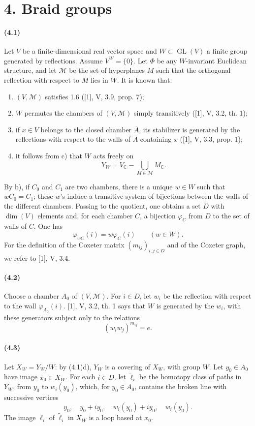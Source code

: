 \documentclass[10pt]{article}
\newcommand{\C}{\mathbb C}
\newcommand{\GL}{\operatorname{GL}}
\begin{document}
\section*{4. Braid groups}

\paragraph{(4.1)} Let \(V\) be a finite-dimensional real vector space and \(W\subset\GL(V)\) a finite group generated by reflections. Assume \(V^W=\{0\}\). Let \(\Phi\) be any \(W\)-invariant Euclidean structure, and let \(\mathcal M\) be the set of hyperplanes \(M\) such that the orthogonal reflection with respect to \(M\) lies in \(W\). It is known that:
\begin{enumerate}[label=\alph*)]
\item \((V,\mathcal M)\) satisfies 1.6 ([1], V, 3.9, prop. 7);
\item \(W\) permutes the chambers of \((V,\mathcal M)\) simply transitively ([1], V, 3.2, th. 1);
\item if \(x\in V\) belongs to the closed chamber \(\overline A\), its stabilizer is generated by the reflections with respect to the walls of \(A\) containing \(x\) ([1], V, 3.3, prop. 1);
\item it follows from c) that \(W\) acts freely on
\[
Y_W=V_\C-\bigcup_{M\in\mathcal M}M_\C.
\]
\end{enumerate}
By b), if \(C_0\) and \(C_1\) are two chambers, there is a unique \(w\in W\) such that \(wC_0=C_1\); these \(w\)'s induce a transitive system of bijections between the walls of the different chambers. Passing to the quotient, one obtains a set \(D\) with \(\dim(V)\) elements and, for each chamber \(C\), a bijection \(\varphi_C\) from \(D\) to the set of walls of \(C\). One has
\[
\tag{4.1.1}
\varphi_{wC}(i)=w\varphi_C(i)\qquad(w\in W).
\]
For the definition of the Coxeter matrix \((m_{ij})_{i,j\in D}\) and of the Coxeter graph, we refer to [1], V, 3.4.

\paragraph{(4.2)} Choose a chamber \(A_0\) of \((V,\mathcal M)\). For \(i\in D\), let \(w_i\) be the reflection with respect to the wall \(\varphi_{A_0}(i)\). [1], V, 3.2, th. 1 says that \(W\) is generated by the \(w_i\), with these generators subject only to the relations
\[
(w_iw_j)^{m_{ij}}=e.
\]

\paragraph{(4.3)} Let \(X_W=Y_W/W\): by (4.1)d), \(Y_W\) is a covering of \(X_W\), with group \(W\). Let \(y_0\in A_0\) have image \(x_0\in X_W\). For each \(i\in D\), let \(\widetilde \ell_i\) be the homotopy class of paths in \(Y_W\), from \(y_0\) to \(w_i(y_0)\), which, for \(y_0\in A_0\), contains the broken line with successive vertices
\[
y_0,\quad y_0+iy_0,\quad w_i(y_0)+iy_0,\quad w_i(y_0).
\]
The image \(\ell_i\) of \(\widetilde\ell_i\) in \(X_W\) is a loop based at \(x_0\).
\end{document}
